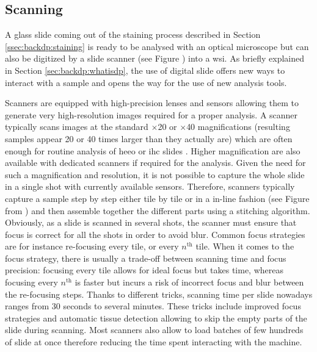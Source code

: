 \subsection{Scanning}
\label{ssec:backdp:scanning}

A glass slide coming out of the staining process described in Section \ref{ssec:backdp:staining} is ready to be analysed with an optical microscope but can also be digitized by a slide scanner (see Figure ) into a \acrshort{wsi}. As briefly explained in Section \ref{sec:backdp:whatisdp}, the use of digital slide offers new ways to interact with a sample and opens the way for the use of new analysis tools.

Scanners are equipped with high-precision lenses and sensors allowing them to generate very high-resolution images required for a proper analysis. A scanner typically scans images at the standard $\times$20 or $\times$40 magnifications (\ie resulting samples appear 20 or 40 times larger than they actually are) which are often enough for routine analysis of \acrshort{heeo} or \acrshort{ihc} slides \parencite{zarella2019practical}. Higher magnification are also available with dedicated scanners if required for the analysis. Given the need for such a magnification and resolution, it is not possible to capture the whole slide in a single shot with currently available sensors. Therefore, scanners typically capture a sample step by step either tile by tile or in a in-line fashion (see Figure  from \parencite{jahn2020digital}) and then assemble together the different parts using a stitching algorithm. Obviously, as a slide is scanned in several shots, the scanner must ensure that focus is correct for all the shots in order to avoid blur. Common focus strategies are for instance re-focusing every tile, or every $n^{\text{th}}$ tile. When it comes to the focus strategy, there is usually a trade-off between scanning time and focus precision: focusing every tile allows for ideal focus but takes time, whereas focusing every $n^{\text{th}}$ is faster but incurs a risk of incorrect focus and blur between the re-focusing steps. Thanks to different tricks, scanning time per slide nowadays ranges from 30 seconds to several minutes. These tricks include improved focus strategies and automatic tissue detection allowing to skip the empty parts of the slide during scanning. Most scanners also allow to load batches of few hundreds of slide at once therefore reducing the time spent interacting with the machine.

